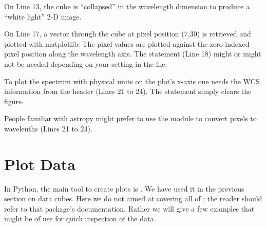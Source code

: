 \documentclass[letterpaper,10pt,english]{sphinxmanual}
\begin{document}
On Line 13, the cube is ``collapsed'' in the wavelength dimension to produce a
``white light'' 2-D image.

On Line 17, a vector through the cube at pixel position (7,30) is retrieved
and plotted with matplotlib.  The pixel values are plotted against the
zero-indexed pixel position along the wavelength axis.  The 
statement (Line 18) might or might not be needed depending on your
 setting in the  file.

To plot the spectrum with physical units on the plot's x-axis one needs the
WCS information from the header (Lines 21 to 24).  The statement 
simply clears the figure.

People familiar with astropy might prefer to use the  module to
convert pixels to wavelenths (Lines 21 to 24).


\section{Plot Data}
\label{data:plot-data}
In Python, the main tool to create plots is .  We have used it
in the previous section on data cubes.  Here we do not aimed at covering all
of ; the reader should refer to that package's documentation.
Rather we will give a few examples that might be of use for quick inspection
of the data.
\end{document}
